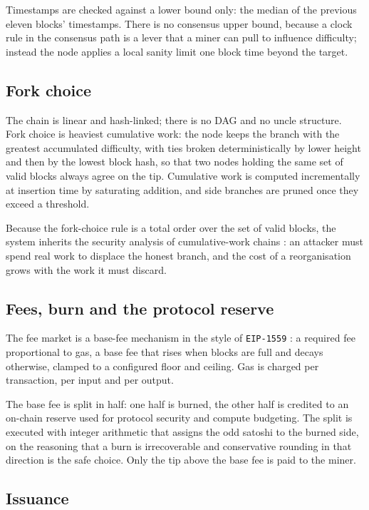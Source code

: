 \documentclass{article}
\begin{document}
Timestamps are checked against a lower bound only: the median of the previous
eleven blocks' timestamps. There is no consensus upper bound, because a
clock rule in the consensus path is a lever that a miner can pull to influence
difficulty; instead the node applies a local sanity limit one block time beyond
the target.

\subsection{Fork choice}

The chain is linear and hash-linked; there is no DAG and no uncle structure.
Fork choice is heaviest cumulative work: the node keeps the branch with the
greatest accumulated difficulty, with ties broken deterministically by lower
height and then by the lowest block hash, so that two nodes holding the same
set of valid blocks always agree on the tip. Cumulative work is computed
incrementally at insertion time by saturating addition, and side branches are
pruned once they exceed a threshold.

Because the fork-choice rule is a total order over the set of valid blocks,
the system inherits the security analysis of cumulative-work chains
\cite{eyal2014securitybitcoin,kiayias2017equitable}: an attacker must spend
real work to displace the honest branch, and the cost of a reorganisation
grows with the work it must discard.

\subsection{Fees, burn and the protocol reserve}

The fee market is a base-fee mechanism in the style of \texttt{EIP-1559}
\cite{buterin2020eip1559}: a required fee proportional to gas, a base fee that
rises when blocks are full and decays otherwise, clamped to a configured floor
and ceiling. Gas is charged per transaction, per input and per output.

The base fee is split in half: one half is burned, the other half is credited
to an on-chain reserve used for protocol security and compute budgeting. The
split is executed with integer arithmetic that assigns the odd satoshi to the
burned side, on the reasoning that a burn is irrecoverable and conservative
rounding in that direction is the safe choice. Only the tip above the base fee
is paid to the miner.

\subsection{Issuance}
\label{sec:issuance}
\end{document}
